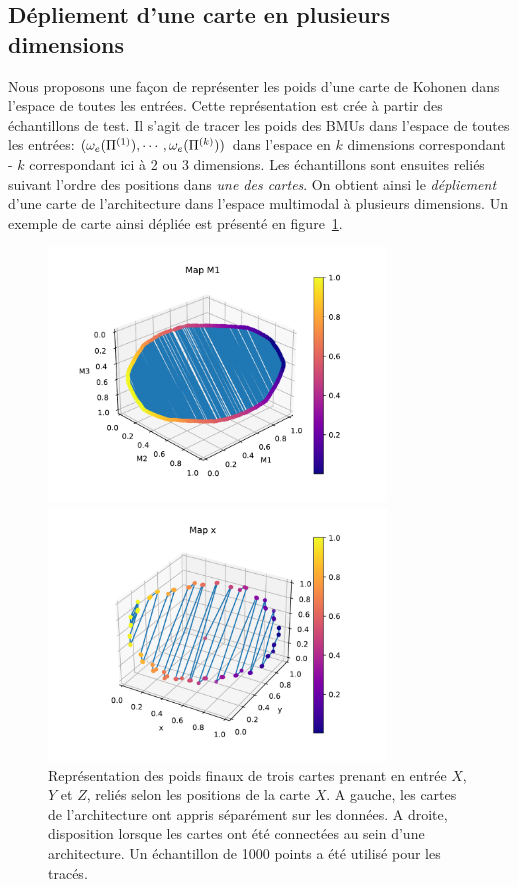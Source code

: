 \subsection{Dépliement d'une carte en plusieurs dimensions}

Nous proposons une façon de représenter les poids d'une carte de Kohonen dans l'espace de toutes les entrées. Cette représentation est crée à partir des échantillons de test. Il s'agit de tracer les poids des BMUs dans l'espace de toutes les entrées: $(\omega_e(\Pi^{({1})}),\cdots,\omega_e(\Pi^{({k})}))$ dans l'espace en $k$ dimensions correspondant - $k$ correspondant ici à 2 ou 3 dimensions. Les échantillons sont ensuites reliés suivant l'ordre des positions dans \emph{une des cartes}. On obtient ainsi le \emph{dépliement} d'une carte de l'architecture dans l'espace multimodal à plusieurs dimensions. Un exemple de carte ainsi dépliée est présenté en figure~\ref{fig:distortion}.
\begin{figure}
\begin{minipage}{0.5\textwidth}
\centering\includegraphics[width=0.8\textwidth]{unco3som}
\end{minipage}
\begin{minipage}{0.5\textwidth}
\centering\includegraphics[width=0.8\textwidth]{disto_Mx}
\end{minipage}
\caption{Représentation des poids finaux de trois cartes prenant en entrée $X$,$Y$ et $Z$, reliés selon les positions de la carte $X$. A gauche, les cartes de l'architecture ont appris séparément sur les données. A droite, disposition lorsque les cartes ont été connectées au sein d'une architecture. Un échantillon de 1000 points a été utilisé pour les tracés.}
\label{fig:distortion}
\end{figure}


